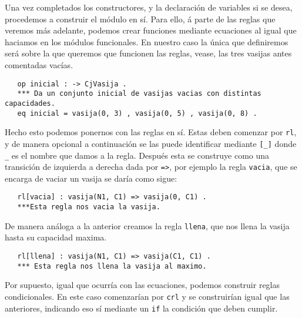 Una vez completados los constructores, y la declaración de variables si se desea, procedemos a construir el módulo en sí. Para ello, á parte de las reglas que veremos más adelante, podemos crear funciones mediante ecuaciones al igual que haciamos en los módulos funcionales. En nuestro caso la única que definiremos será sobre la que queremos que funcionen las reglas, vease, las tres vasijas antes comentadas vacías.\par

{\codesize
\begin{verbatim}
   op inicial : -> CjVasija .
   *** Da un conjunto inicial de vasijas vacias con distintas capacidades.
   eq inicial = vasija(0, 3) , vasija(0, 5) , vasija(0, 8) .
\end{verbatim}
}

Hecho esto podemos ponernos con las reglas en sí. Estas deben comenzar por \verb"rl", y de manera opcional a continuación se las puede identificar mediante \verb"[_]" donde \verb"_" es el nombre que damos a la regla. Después esta se construye como una transición de izquierda a derecha dada por \verb"=>", por ejemplo la regla \texttt{vacia}, que se encarga de vaciar un vasija se daría como sigue:\par

{\codesize
\begin{verbatim}
   rl[vacia] : vasija(N1, C1) => vasija(0, C1) .
   ***Esta regla nos vacia la vasija.
\end{verbatim}
}
De manera análoga a la anterior creamos la regla \texttt{llena}, que nos llena la vasija hasta su capacidad maxima.\par
{\codesize
\begin{verbatim}
   rl[llena] : vasija(N1, C1) => vasija(C1, C1) .
   *** Esta regla nos llena la vasija al maximo.
\end{verbatim}
}
Por supuesto, igual que ocurría con las ecuaciones, podemos construir reglas condicionales. En este caso comenzarían por \verb"crl" y se construirían igual que las anteriores, indicando eso sí mediante un \texttt{if} la condición que deben cumplir.\par

